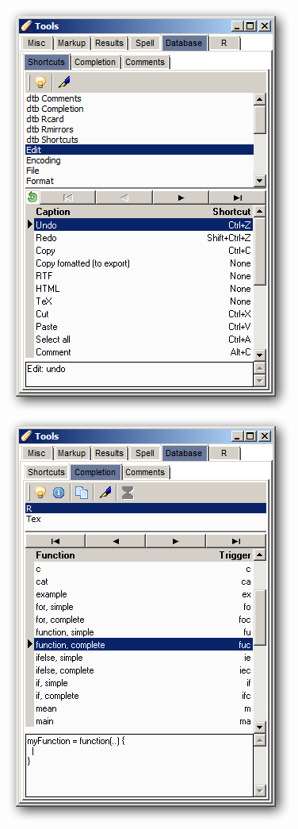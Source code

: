 \begin{figure}[h!]
  \includegraphics[scale=0.35]{./res/tools_database_shortcuts.png}~~
  \includegraphics[scale=0.35]{./res/tools_database_completion.png}~~

\end{figure}
